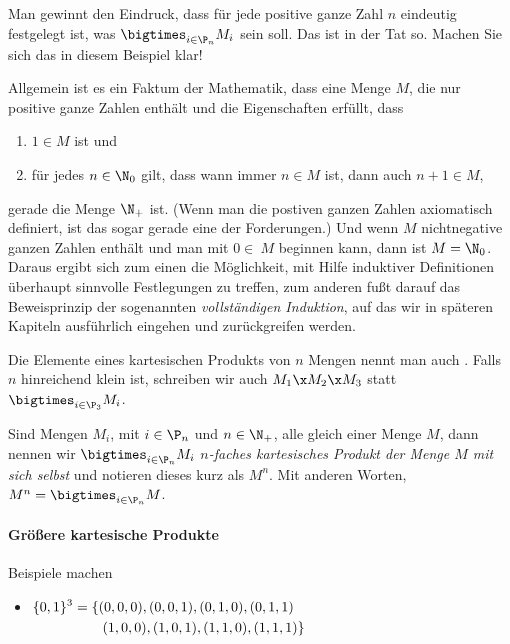 Man gewinnt den Eindruck, dass für jede positive ganze Zahl $n$
eindeutig festgelegt ist, was $\bigtimes_{i\in\P_{n}} M_i$ sein soll.
%
Das ist in der Tat so.
%
Machen Sie sich das in diesem Beispiel klar!

Allgemein ist es ein Faktum der Mathematik, dass eine Menge $M$, die
nur positive ganze Zahlen enthält und die Eigenschaften erfüllt,
dass
\begin{enumerate}
\item $1\in M$ ist und
\item für jedes $n\in\N_0$ gilt, dass wann immer $n\in M$ ist, dann
  auch $n+1\in M$,
\end{enumerate}
gerade die Menge $\N_+$ ist.
%
(Wenn man die postiven ganzen Zahlen axiomatisch definiert, ist das sogar gerade
eine der Forderungen.)
%
Und wenn $M$ nichtnegative ganzen Zahlen enthält und man mit $0\in\ M$ beginnen kann, dann ist $M=\N_0$.
%
Daraus ergibt sich zum einen die Möglichkeit, mit Hilfe induktiver
Definitionen überhaupt sinnvolle Festlegungen zu treffen, zum anderen
fußt darauf das Beweisprinzip der sogenannten \emph{vollständigen
  Induktion}, auf das wir in späteren Kapiteln ausführlich eingehen
und zurückgreifen werden.

Die Elemente eines kartesischen Produkts von $n$
Mengen nennt man auch .
%
Falls $n$ hinreichend klein ist, schreiben wir \zB auch $M_1\x M_2\x M_3$ statt $\bigtimes_{i\in\P_3} M_i$.

Sind Mengen $M_i$, mit $i\in\P_n$ und $n\in\N_+$,
alle gleich einer Menge $M$, dann nennen wir $\bigtimes_{i\in\P_n} M_i$ \emph{$n$-faches
kartesisches Produkt der Menge $M$ mit sich selbst} und notieren dieses kurz als $M^n$.
%
Mit anderen Worten, $M^n=\bigtimes_{i\in\P_n} M$.
%
\begin{tutorium}
  \paragraph{Größere kartesische Produkte}

  Beispiele machen
  \begin{itemize}
  \item $\begin{aligned}[t]
      \{0,1\}^3 &= \{ (0,0,0), (0,0,1), (0,1,0), (0,1,1) \\
      &\mathrel{\hphantom{= \{}} (1,0,0), (1,0,1), (1,1,0), (1,1,1) \}
    \end{aligned}$
  \end{itemize}
\end{tutorium}

